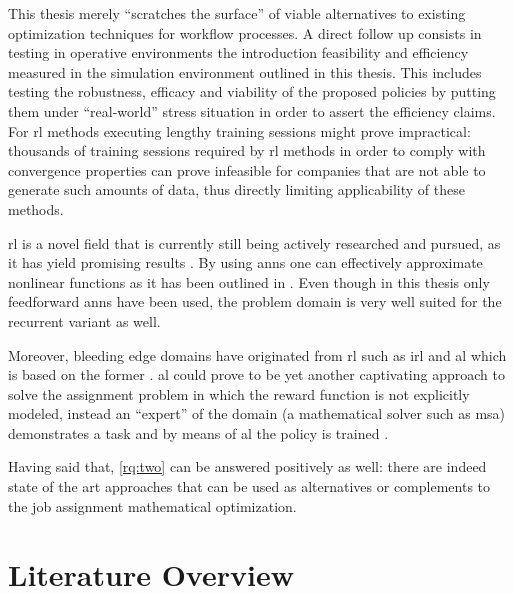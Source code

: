 \documentclass{seal_thesis}
\begin{document}
This thesis merely ``scratches the surface'' of viable alternatives to existing optimization techniques for workflow processes. A direct follow up consists in testing in operative environments the introduction feasibility and efficiency measured in the simulation environment outlined in this thesis. This includes testing the robustness, efficacy and viability of the proposed policies by putting them under ``real-world'' stress situation in order to assert the efficiency claims. For \gls{rl} methods executing lengthy training sessions might prove impractical: thousands of training sessions required by \gls{rl} methods in order to comply with convergence properties can prove infeasible for companies that are not able to generate such amounts of data, thus directly limiting applicability of these methods.

\gls{rl} is a novel field that is currently still being actively researched and pursued, as it has yield promising results \cite{Mnih2015,Silver2016}. By using \glspl{ann} one can effectively approximate nonlinear functions as it has been outlined in . Even though in this thesis only feedforward \glspl{ann} have been used, the problem domain is very well suited for the recurrent variant as well.

Moreover, bleeding edge domains have originated from \gls{rl} such as \gls{irl} \cite{Ng2000} and \gls{al} which is based on the former \cite{Abbeel2004}. \gls{al} could prove to be yet another captivating approach to solve the assignment problem in which the reward function is not explicitly modeled, instead an ``expert'' of the domain (\ie a mathematical solver such as \gls{msa}) demonstrates a task and by means of \gls{al} the policy is trained \cite{Abbeel2004}.

Having said that, \ref{rq:two} can be answered positively as well: there are indeed state of the art approaches that can be used as alternatives or complements to the job assignment mathematical optimization. 

\appendix

\glsresetall

\chapter{Literature Overview}


\clearpage
\end{document}
